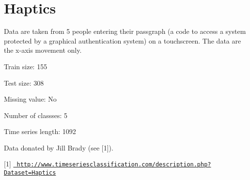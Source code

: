 \chapter{Haptics}
\hypertarget{md_external_2data_2UCRArchive__2018_2Haptics_2README}{}\label{md_external_2data_2UCRArchive__2018_2Haptics_2README}
\label{md_external_2data_2UCRArchive__2018_2Haptics_2README_autotoc_md118}%
%
 Data are taken from 5 people entering their passgraph (a code to access a system protected by a graphical authentication system) on a touchscreen. The data are the x-\/axis movement only.

Train size\+: 155

Test size\+: 308

Missing value\+: No

Number of classses\+: 5

Time series length\+: 1092

Data donated by Jill Brady (see \mbox{[}1\mbox{]}).

\mbox{[}1\mbox{]} \href{http://www.timeseriesclassification.com/description.php?Dataset=Haptics}{\texttt{ http\+://www.\+timeseriesclassification.\+com/description.\+php?\+Dataset=\+Haptics}} 